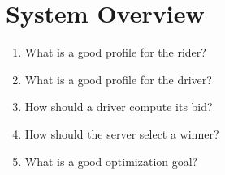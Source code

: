 \section{System Overview}

\begin{enumerate}
\item What is a good profile for the rider?
\item What is a good profile for the driver?
\item How should a driver compute its bid?
\item How should the server select a winner?
\item What is a good optimization goal?
\end{enumerate}